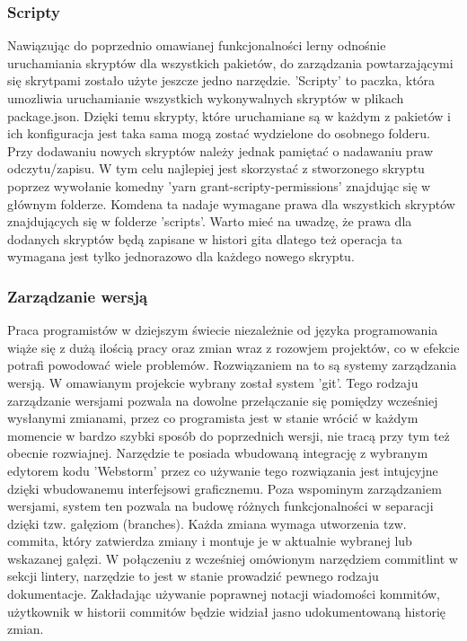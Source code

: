 \subsubsection{Scripty}
Nawiązując do poprzednio omawianej funkcjonalności lerny odnośnie uruchamiania skryptów dla wszystkich pakietów, do zarządzania powtarzającymi się skrytpami zostało użyte jeszcze jedno narzędzie. 'Scripty' to paczka, która umozliwia uruchamianie wszystkich wykonywalnych skryptów w plikach package.json. Dzięki temu skrypty, które uruchamiane są w każdym z pakietów i ich konfiguracja jest taka sama mogą zostać wydzielone do osobnego folderu. Przy dodawaniu nowych skryptów należy jednak pamiętać o nadawaniu praw odczytu/zapisu. W tym celu najlepiej jest skorzystać z stworzonego skryptu poprzez wywołanie komedny 'yarn grant-scripty-permissions' znajdując się w głównym folderze. Komdena ta nadaje wymagane prawa dla wszystkich skryptów znajdujących się w folderze 'scripts'. Warto mieć na uwadzę, że prawa dla dodanych skryptów będą zapisane w histori gita dlatego też operacja ta wymagana jest tylko jednorazowo dla każdego nowego skryptu.

\subsubsection{Zarządzanie wersją}

Praca programistów w dziejszym świecie niezależnie od języka programowania wiąże się z dużą ilością pracy oraz zmian wraz z rozowjem projektów, co w efekcie potrafi powodować wiele problemów. Rozwiązaniem na to są systemy zarządzania wersją. W omawianym projekcie wybrany został system 'git'. Tego rodzaju zarządzanie wersjami pozwala na dowolne przełączanie się pomiędzy wcześniej wysłanymi zmianami, przez co programista jest w stanie wrócić w każdym momencie w bardzo szybki sposób do poprzednich wersji, nie tracą przy tym też obecnie rozwiajnej. Narzędzie te posiada wbudowaną integrację z wybranym edytorem kodu 'Webstorm' przez co używanie tego rozwiązania jest intujcyjne dzięki wbudowanemu interfejsowi graficznemu. Poza wspominym zarządzaniem wersjami, system ten pozwala na budowę różnych funkcjonalności w separacji dzięki tzw. gałęziom (branches). Każda zmiana wymaga utworzenia tzw. commita, który zatwierdza zmiany i montuje je w aktualnie wybranej lub wskazanej gałęzi.
W połączeniu z wcześniej omówionym narzędziem commitlint w sekcji lintery, narzędzie to jest w stanie prowadzić pewnego rodzaju dokumentacje. Zakładając używanie poprawnej notacji wiadomości kommitów, użytkownik w historii commitów będzie widział jasno udokumentowaną historię zmian.

